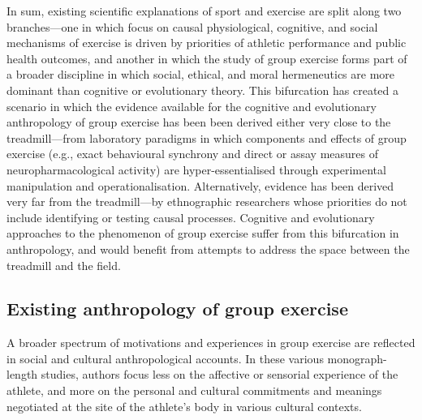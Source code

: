 In sum, existing scientific explanations of sport and exercise are split along two branches---one in which focus on causal physiological, cognitive, and social mechanisms of exercise is driven by priorities of athletic performance and public health outcomes, and another in which the study of group exercise forms part of a broader discipline in which social, ethical, and moral hermeneutics are more dominant than cognitive or evolutionary theory.  This bifurcation has created a scenario in which the evidence available for the cognitive and evolutionary anthropology of group exercise has been been derived either very close to the treadmill---from laboratory paradigms in which components and effects of group exercise (e.g., exact behavioural synchrony and direct or assay measures of neuropharmacological activity) are hyper-essentialised through experimental manipulation and operationalisation.  Alternatively, evidence has been derived very far from the treadmill---by ethnographic researchers whose priorities do not include identifying or testing causal processes. Cognitive and evolutionary approaches to the phenomenon of group exercise suffer from this bifurcation in anthropology, and would benefit from attempts to address the space between the treadmill and the field.












\subsection{Existing anthropology of group exercise}
A broader spectrum of motivations and experiences in group exercise are reflected in social and cultural anthropological accounts.  In these various monograph-length studies, authors focus less on the affective or sensorial experience of the athlete, and more on the personal and cultural commitments and meanings negotiated at the site of the athlete’s body in various cultural contexts.

